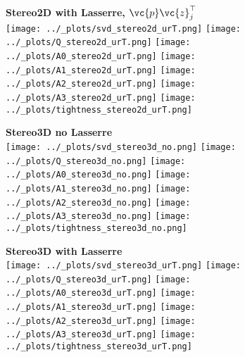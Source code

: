 \begin{figure}[h]
  \centering
\textbf{\large{Stereo2D with Lasserre, $\vc{p}\vc{z}_j^\top$}} \\
  \vspace{2em}
  \texttt{[image: ../\_plots/svd\_stereo2d\_urT.png]}
  \texttt{[image: ../\_plots/Q\_stereo2d\_urT.png]}
  \texttt{[image: ../\_plots/A0\_stereo2d\_urT.png]}
  \texttt{[image: ../\_plots/A1\_stereo2d\_urT.png]}
  \texttt{[image: ../\_plots/A2\_stereo2d\_urT.png]}
  \texttt{[image: ../\_plots/A3\_stereo2d\_urT.png]}
  \texttt{[image: ../\_plots/tightness\_stereo2d\_urT.png]}
\end{figure}


\begin{figure}[h]
  \centering
  \textbf{\large{Stereo3D no Lasserre}} \\
  \vspace{2em}
  \texttt{[image: ../\_plots/svd\_stereo3d\_no.png]}
  \texttt{[image: ../\_plots/Q\_stereo3d\_no.png]}
  \texttt{[image: ../\_plots/A0\_stereo3d\_no.png]}
  \texttt{[image: ../\_plots/A1\_stereo3d\_no.png]}
  \texttt{[image: ../\_plots/A2\_stereo3d\_no.png]}
  \texttt{[image: ../\_plots/A3\_stereo3d\_no.png]}
  \texttt{[image: ../\_plots/tightness\_stereo3d\_no.png]}
\end{figure}

\begin{figure}[h]
  \centering
  \textbf{\large{Stereo3D with Lasserre}} \\
  \vspace{2em}
  \texttt{[image: ../\_plots/svd\_stereo3d\_urT.png]}
  \texttt{[image: ../\_plots/Q\_stereo3d\_urT.png]}
  \texttt{[image: ../\_plots/A0\_stereo3d\_urT.png]}
  \texttt{[image: ../\_plots/A1\_stereo3d\_urT.png]}
  \texttt{[image: ../\_plots/A2\_stereo3d\_urT.png]}
  \texttt{[image: ../\_plots/A3\_stereo3d\_urT.png]}
  \texttt{[image: ../\_plots/tightness\_stereo3d\_urT.png]}
\end{figure}



